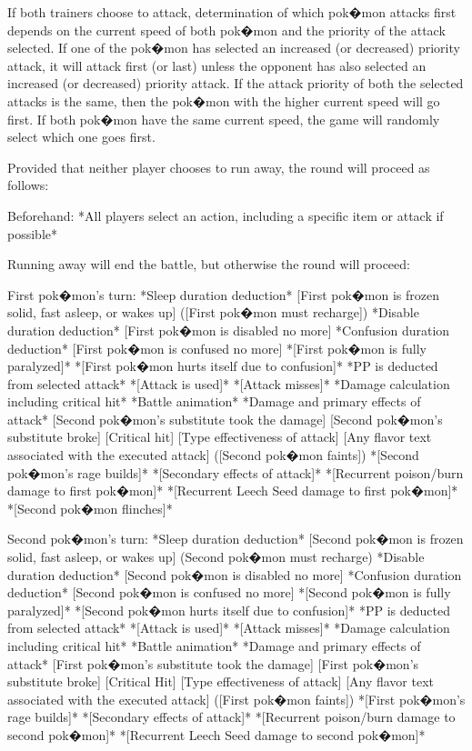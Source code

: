 \documentclass[reprint, aps, prl, paper=A4]{revtex4-1}
\begin{document}
If both trainers choose to attack, determination of which pok�mon attacks first depends on the
current speed of both pok�mon and the priority of the attack selected. If one of the pok�mon
has selected an increased (or decreased) priority attack, it will attack first (or last) unless
the opponent has also selected an increased (or decreased) priority attack. If the attack
priority of both the selected attacks is the same, then the pok�mon with the higher current
speed will go first. If both pok�mon have the same current speed, the game will randomly select
which one goes first.

Provided that neither player chooses to run away, the round will proceed as follows:

Beforehand:
     *All players select an action, including a specific item or attack if possible*

Running away will end the battle, but otherwise the round will proceed:

First pok�mon's turn:
     *Sleep duration deduction*
     [First pok�mon is frozen solid, fast asleep, or wakes up]
     ([First pok�mon must recharge])
     *Disable duration deduction*
     [First pok�mon is disabled no more]
     *Confusion duration deduction*
     [First pok�mon is confused no more]
     *[First pok�mon is fully paralyzed]*
     *[First pok�mon hurts itself due to confusion]*
     *PP is deducted from selected attack*
     *[Attack is used]*
     *[Attack misses]*
     *Damage calculation including critical hit*
     *Battle animation*
     *Damage and primary effects of attack*
     [Second pok�mon's substitute took the damage]
     [Second pok�mon's substitute broke]
     [Critical hit]
     [Type effectiveness of attack]
     [Any flavor text associated with the executed attack]
     ([Second pok�mon faints])
     *[Second pok�mon's rage builds]*
     *[Secondary effects of attack]*
     *[Recurrent poison/burn damage to first pok�mon]*
     *[Recurrent Leech Seed damage to first pok�mon]*
     *[Second pok�mon flinches]*

Second pok�mon's turn:
     *Sleep duration deduction*
     [Second pok�mon is frozen solid, fast asleep, or wakes up]
     (Second pok�mon must recharge)
     *Disable duration deduction*
     [Second pok�mon is disabled no more]
     *Confusion duration deduction*
     [Second pok�mon is confused no more]
     *[Second pok�mon is fully paralyzed]*
     *[Second pok�mon hurts itself due to confusion]*
     *PP is deducted from selected attack*
     *[Attack is used]*
     *[Attack misses]*
     *Damage calculation including critical hit*
     *Battle animation*
     *Damage and primary effects of attack*
     [First pok�mon's substitute took the damage]
     [First pok�mon's substitute broke]
     [Critical Hit]
     [Type effectiveness of attack]
     [Any flavor text associated with the executed attack]
     ([First pok�mon faints])
     *[First pok�mon's rage builds]*
     *[Secondary effects of attack]*
     *[Recurrent poison/burn damage to second pok�mon]*
     *[Recurrent Leech Seed damage to second pok�mon]*
\end{document}

